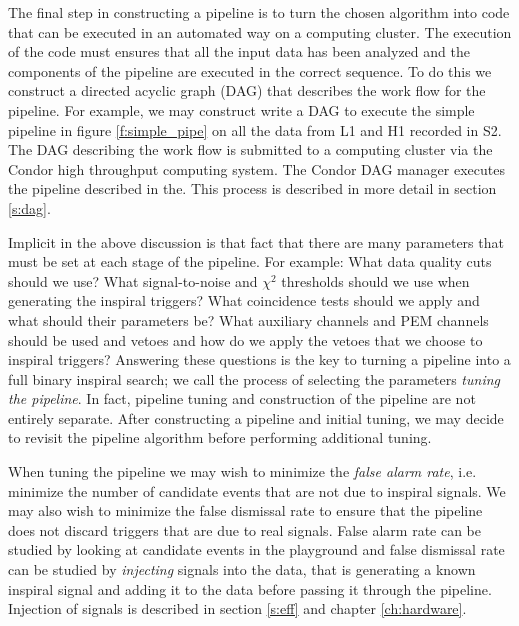 The final step in constructing a pipeline is to turn the chosen algorithm into
code that can be executed in an automated way on a computing cluster. The
execution of the code must ensures that all the input data has been analyzed
and the components of the pipeline are executed in the correct sequence. To do
this we construct a directed acyclic graph (DAG) that describes the work flow
for the pipeline.  For example, we may construct write a DAG to execute the
simple pipeline in figure \ref{f:simple_pipe} on all the data from L1 and H1
recorded in S2. The DAG describing the work flow is submitted to a computing
cluster via the Condor high throughput computing system. The Condor DAG
manager executes the pipeline described in the. This process is described in
more detail in section \ref{s:dag}.

Implicit in the above discussion is that fact that there are many parameters
that must be set at each stage of the pipeline. For example: What data quality
cuts should we use? What signal-to-noise and $\chi^2$ thresholds should we use
when generating the inspiral triggers? What coincidence tests should we apply
and what should their parameters be? What auxiliary channels and PEM channels
should be used and vetoes and how do we apply the vetoes that we choose to
inspiral triggers? Answering these questions is the key to turning a pipeline
into a full binary inspiral search; we call the process of selecting the
parameters \emph{tuning the pipeline}. In fact, pipeline tuning and
construction of the pipeline are not entirely separate. After constructing a
pipeline and initial tuning, we may decide to revisit the pipeline algorithm
before performing additional tuning.

When tuning the pipeline we may wish to minimize the \emph{false alarm rate},
i.e. minimize the number of candidate events that are not due to inspiral
signals.  We may also wish to minimize the false dismissal rate to ensure that
the pipeline does not discard triggers that are due to real signals.  False
alarm rate can be studied by looking at candidate events in the playground and
false dismissal rate can be studied by \emph{injecting} signals into the data,
that is generating a known inspiral signal and adding it to the data before
passing it through the pipeline. Injection of signals is described in section
\ref{s:eff} and chapter \ref{ch:hardware}.

